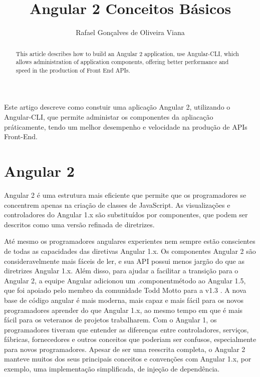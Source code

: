 \documentclass[12pt]{article}
\title{Angular 2 Conceitos Básicos}
\author{Rafael Gonçalves de Oliveira Viana\inst{1} }
\begin{document}
 

\maketitle

\begin{abstract}
This article describes how to build an Angular 2 application, use Angular-CLI, which allows administration of application components, offering better performance and speed in the production of Front End APIs.
\end{abstract}
     
\begin{resumo} 
  Este artigo descreve como constuir uma aplicação Angular 2, utilizando o Angular-CLI, que permite administar os componentes da apliacação práticamente, tendo um melhor desempenho e velocidade na produção de APIs Front-End. 
\end{resumo}


\section{Angular 2}

Angular 2 é uma estrutura mais eficiente que permite que os programadores se concentrem apenas na criação de classes de JavaScript. As visualizações e controladores do Angular 1.x são substituídos por componentes, que podem ser descritos como uma versão refinada de diretrizes.

Até mesmo os programadores angulares experientes nem sempre estão conscientes de todas as capacidades das diretivas Angular 1.x. Os componentes Angular 2 são consideravelmente mais fáceis de ler, e sua API possui menos jargão do que as diretrizes Angular 1.x. Além disso, para ajudar a facilitar a transição para o Angular 2, a equipe Angular adicionou um .componentmétodo ao Angular 1.5, que foi apoiado pelo membro da comunidade Todd Motto para a v1.3 .
A nova base de código angular é mais moderna, mais capaz e mais fácil para os novos programadores aprender do que Angular 1.x, ao mesmo tempo em que é mais fácil para os veteranos de projetos trabalharem.
Com o Angular 1, os programadores tiveram que entender as diferenças entre controladores, serviços, fábricas, fornecedores e outros conceitos que poderiam ser confusos, especialmente para novos programadores.
Apesar de ser uma reescrita completa, o Angular 2 manteve muitos dos seus principais conceitos e convenções com Angular 1.x, por exemplo, uma implementação simplificada, de injeção de dependência. \cite{ehrenfeucht1992angular}
\end{document}
